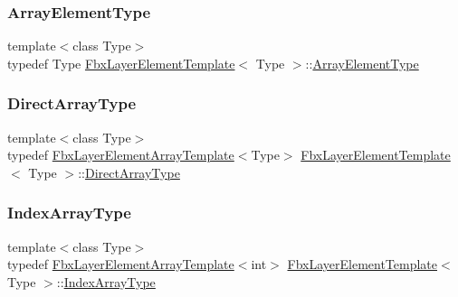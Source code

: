 \subsubsection{\texorpdfstring{Array\+Element\+Type}{ArrayElementType}}
{\footnotesize\ttfamily template$<$class Type$>$ \\
typedef Type \hyperlink{class_fbx_layer_element_template}{Fbx\+Layer\+Element\+Template}$<$ Type $>$\+::\hyperlink{class_fbx_layer_element_template_a24cfd1d513a54140bde996ccfa2bf2b6}{Array\+Element\+Type}}

\mbox{\label{class_fbx_layer_element_template_a1adf77aa24da5ff9786bb19286dcac13}} 
\subsubsection{\texorpdfstring{Direct\+Array\+Type}{DirectArrayType}}
{\footnotesize\ttfamily template$<$class Type$>$ \\
typedef \hyperlink{class_fbx_layer_element_array_template}{Fbx\+Layer\+Element\+Array\+Template}$<$Type$>$ \hyperlink{class_fbx_layer_element_template}{Fbx\+Layer\+Element\+Template}$<$ Type $>$\+::\hyperlink{class_fbx_layer_element_template_a1adf77aa24da5ff9786bb19286dcac13}{Direct\+Array\+Type}}

\mbox{\label{class_fbx_layer_element_template_ada80e444d13e2a73cb90551a712a58ed}} 
\subsubsection{\texorpdfstring{Index\+Array\+Type}{IndexArrayType}}
{\footnotesize\ttfamily template$<$class Type$>$ \\
typedef \hyperlink{class_fbx_layer_element_array_template}{Fbx\+Layer\+Element\+Array\+Template}$<$int$>$ \hyperlink{class_fbx_layer_element_template}{Fbx\+Layer\+Element\+Template}$<$ Type $>$\+::\hyperlink{class_fbx_layer_element_template_ada80e444d13e2a73cb90551a712a58ed}{Index\+Array\+Type}}



